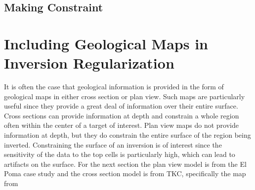 \subsection{Making Constraint}
\label{subsec:makeConstBH}
%
%
%
%

\section{Including Geological Maps in Inversion Regularization}
\label{sec:maps}

It is often the case that geological information is provided in the form of geological maps in either cross section or plan view. Such maps are particularly useful since they provide a great deal of information over their entire surface. Cross sections can provide information at depth and constrain a whole region often within the center of a target of interest. Plan view maps do not provide information at depth, but they do constrain the entire surface of the region being inverted.  Constraining the surface of an inversion is of interest since the sensitivity of the data to the top cells is particularly high, which can lead to artifacts on the surface. For the next section the plan view model is from the El Poma case study and the cross section model is from TKC, specifically the map from \citep{harder2006geology}

